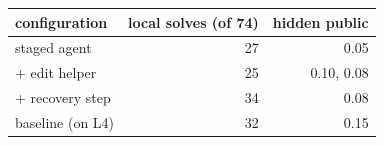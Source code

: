 \begin{tabular}{lrr}
\toprule
configuration & local solves (of 74) & hidden public \\
\midrule
staged agent & 27 & 0.05 \\
+ edit helper & 25 & 0.10, 0.08 \\
+ recovery step & 34 & 0.08 \\
baseline (on L4) & 32 & 0.15 \\
\bottomrule
\end{tabular}
